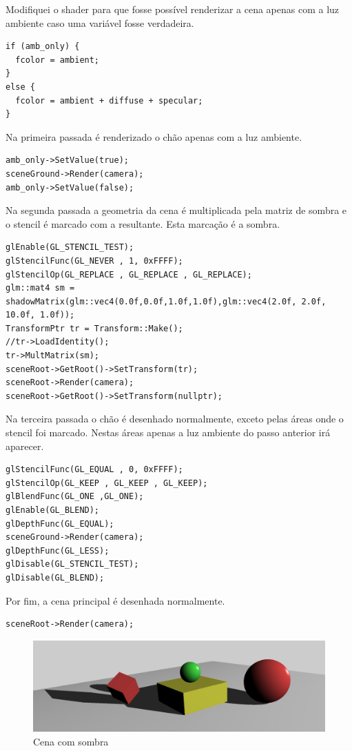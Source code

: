 \documentclass[11pt, a4paper]{article}
\begin{document}
Modifiquei o shader para que fosse possível renderizar a cena apenas com a luz 
ambiente caso uma variável fosse verdadeira.

\begin{verbatim}
if (amb_only) {
  fcolor = ambient;
}
else {
  fcolor = ambient + diffuse + specular;
}
\end{verbatim}

Na primeira passada é renderizado o chão apenas com a luz ambiente.

\begin{verbatim}
amb_only->SetValue(true);
sceneGround->Render(camera);
amb_only->SetValue(false);
\end{verbatim}


Na segunda passada a geometria da cena é multiplicada pela matriz de sombra e o 
stencil é marcado com a resultante. Esta marcação é a sombra.

\begin{verbatim}
glEnable(GL_STENCIL_TEST);
glStencilFunc(GL_NEVER , 1, 0xFFFF);
glStencilOp(GL_REPLACE , GL_REPLACE , GL_REPLACE);
glm::mat4 sm = shadowMatrix(glm::vec4(0.0f,0.0f,1.0f,1.0f),glm::vec4(2.0f, 2.0f, 
10.0f, 1.0f));
TransformPtr tr = Transform::Make();
//tr->LoadIdentity();
tr->MultMatrix(sm);
sceneRoot->GetRoot()->SetTransform(tr);
sceneRoot->Render(camera);
sceneRoot->GetRoot()->SetTransform(nullptr);
\end{verbatim}

Na terceira passada o chão é desenhado normalmente, exceto pelas áreas onde o 
stencil foi marcado. Nestas áreas apenas a luz ambiente do passo anterior irá 
aparecer.

\begin{verbatim}
glStencilFunc(GL_EQUAL , 0, 0xFFFF);
glStencilOp(GL_KEEP , GL_KEEP , GL_KEEP);
glBlendFunc(GL_ONE ,GL_ONE);
glEnable(GL_BLEND);
glDepthFunc(GL_EQUAL);
sceneGround->Render(camera);
glDepthFunc(GL_LESS);
glDisable(GL_STENCIL_TEST);
glDisable(GL_BLEND);
\end{verbatim}

Por fim, a cena principal é desenhada normalmente.

\begin{verbatim}
sceneRoot->Render(camera);
\end{verbatim}

\begin{figure}[H]
  \begin{center}
  \includegraphics[width=0.8\linewidth]{shadow.png}
  \caption{Cena com sombra}
  \label{fig:vaz}
  \end{center}
\end{figure}
\end{document}
